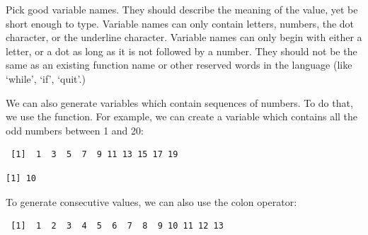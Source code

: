 Pick good variable names. They should describe the meaning of the value, yet be short enough to type. Variable names can only contain letters, numbers, the dot character, or the underline character. Variable names can only begin with either a letter, or a dot as long as it is not followed by a number. They should not be the same as an existing function name or other reserved words in the language (like `while', `if', `quit'.)

We can also generate variables which contain sequences of numbers. To do that, we use the  function. For example, we can create a variable which contains all the odd numbers between 1 and 20:
\begin{knitrout}
\color{fgcolor}\begin{kframe}
\begin{alltt}
 \hlkwb{<-} \hlstd{(}\hlstd{,}\hlstd{,}\hlstd{=}\hlstd{))}
\end{alltt}
\begin{verbatim}
 [1]  1  3  5  7  9 11 13 15 17 19
\end{verbatim}
\begin{alltt}
\end{alltt}
\begin{verbatim}
[1] 10
\end{verbatim}
\end{kframe}
\end{knitrout}

To generate consecutive values, we can also use the colon operator:
\begin{knitrout}
\color{fgcolor}\begin{kframe}
\begin{alltt}
 \hlkwb{<-} \hlopt{:}\hlstd{)}
\end{alltt}
\begin{verbatim}
 [1]  1  2  3  4  5  6  7  8  9 10 11 12 13
\end{verbatim}
\end{kframe}
\end{knitrout}

